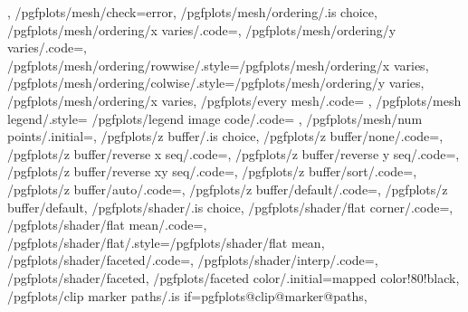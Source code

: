 {{{{				%
			}%
		}%
	},%
	/pgfplots/mesh/check=error,
	/pgfplots/mesh/ordering/.is choice,
	/pgfplots/mesh/ordering/x varies/.code={\def\pgfplots@plot@mesh@ordering{0}},
	/pgfplots/mesh/ordering/y varies/.code={\def\pgfplots@plot@mesh@ordering{1}},
	/pgfplots/mesh/ordering/rowwise/.style={/pgfplots/mesh/ordering/x varies},
	/pgfplots/mesh/ordering/colwise/.style={/pgfplots/mesh/ordering/y varies},
	/pgfplots/mesh/ordering/x varies,
	/pgfplots/every mesh/.code={%
	},%
	/pgfplots/mesh legend/.style={%
		/pgfplots/legend image code/.code={%
		}%
	},
	/pgfplots/mesh/num points/.initial=\numcoords,%
	/pgfplots/z buffer/.is choice,%
	/pgfplots/z buffer/none/.code={\def\pgfplotsplothandlermesh@zbuffer@choice{0}},%
	/pgfplots/z buffer/reverse x seq/.code={\def\pgfplotsplothandlermesh@zbuffer@choice{1}},%
	/pgfplots/z buffer/reverse y seq/.code={\def\pgfplotsplothandlermesh@zbuffer@choice{2}},%
	/pgfplots/z buffer/reverse xy seq/.code={\def\pgfplotsplothandlermesh@zbuffer@choice{3}},%
	/pgfplots/z buffer/sort/.code={\def\pgfplotsplothandlermesh@zbuffer@choice{4}},%
	/pgfplots/z buffer/auto/.code={\def\pgfplotsplothandlermesh@zbuffer@choice{5}},%
	/pgfplots/z buffer/default/.code={\def\pgfplotsplothandlermesh@zbuffer@choice{6}},%
	/pgfplots/z buffer/default,%
	/pgfplots/shader/.is choice,
	/pgfplots/shader/flat corner/.code={\def\pgfplotsplothandlermesh@shader{0}\def\pgfplotsplothandlermesh@flatmode{c}},
	/pgfplots/shader/flat mean/.code={\def\pgfplotsplothandlermesh@shader{0}\def\pgfplotsplothandlermesh@flatmode{m}},
	/pgfplots/shader/flat/.style={/pgfplots/shader/flat mean},%
	/pgfplots/shader/faceted/.code={\def\pgfplotsplothandlermesh@shader{1}},
	/pgfplots/shader/interp/.code={\def\pgfplotsplothandlermesh@shader{2}},
	/pgfplots/shader/faceted,
	/pgfplots/faceted color/.initial=mapped color!80!black,
	/pgfplots/clip marker paths/.is if=pgfplots@clip@marker@paths,
}
